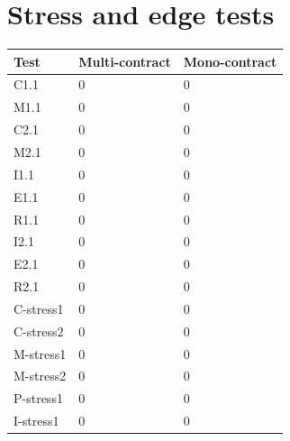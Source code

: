 \documentclass{article}
\begin{document}
	\section{Stress and edge tests}
	\label{app:stress-and-edge-tests}

		\begin{tabular}{| l | l | l |}
			\hline
			Test & Multi-contract & Mono-contract \\ \hline
			C1.1 & 0 & 0 \\ \hline
			M1.1 & 0 & 0 \\ \hline
			C2.1 & 0 & 0 \\ \hline
			M2.1 & 0 & 0 \\ \hline
			I1.1 & 0 & 0 \\ \hline
			E1.1 & 0 & 0 \\ \hline
			R1.1 & 0 & 0 \\ \hline
			I2.1 & 0 & 0 \\ \hline
			E2.1 & 0 & 0 \\ \hline
			R2.1 & 0 & 0 \\ \hline
			C-stress1 & 0 & 0 \\ \hline
			C-stress2 & 0 & 0 \\ \hline
			M-stress1 & 0 & 0 \\ \hline
			M-stress2 & 0 & 0 \\ \hline
			P-stress1 & 0 & 0 \\ \hline
			I-stress1 & 0 & 0 \\
			\hline
		\end{tabular}
\end{document}
